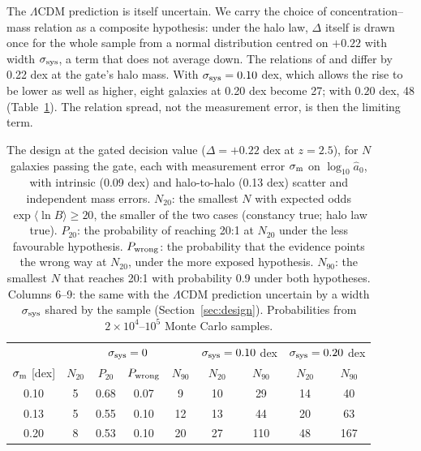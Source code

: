 \documentclass[fleqn,usenatbib]{mnras}
\begin{document}
The $\Lambda$CDM prediction is itself uncertain. We carry the choice of concentration--mass relation as a composite hypothesis: under the halo law, $\Delta$ itself is drawn once for the whole sample from a normal distribution centred on $+0.22$ with width $\sigma_{\rm sys}$, a term that does not average down. The relations of \citet{DuttonMaccio2014} and \citet{Duffy2008} differ by 0.22 dex at the gate's halo mass. With $\sigma_{\rm sys}=0.10$ dex, which allows the rise to be lower as well as higher, eight galaxies at 0.20 dex become 27; with $0.20$ dex, 48 (Table~\ref{tab:odds}). The relation spread, not the measurement error, is then the limiting term.

\begin{table}
\caption{The design at the gated decision value ($\Delta=+0.22$ dex at $z=2.5$), for $N$ galaxies passing the gate, each with measurement error $\sigma_{\rm m}$ on $\log_{10}\hat a_0$, with intrinsic (0.09 dex) and halo-to-halo (0.13 dex) scatter and independent mass errors. $N_{20}$: the smallest $N$ with expected odds $\exp\langle\ln B\rangle\geq20$, the smaller of the two cases (constancy true; halo law true). $P_{20}$: the probability of reaching 20:1 at $N_{20}$ under the less favourable hypothesis. $P_{\rm wrong}$: the probability that the evidence points the wrong way at $N_{20}$, under the more exposed hypothesis. $N_{90}$: the smallest $N$ that reaches 20:1 with probability 0.9 under both hypotheses. Columns 6--9: the same with the $\Lambda$CDM prediction uncertain by a width $\sigma_{\rm sys}$ shared by the sample (Section~\ref{sec:design}). Probabilities from $2\times10^4$--$10^5$ Monte Carlo samples.}
\label{tab:odds}
\begin{tabular}{ccccccccc}
\toprule
 & \multicolumn{4}{c}{$\sigma_{\rm sys}=0$} & \multicolumn{2}{c}{$\sigma_{\rm sys}=0.10$ dex} & \multicolumn{2}{c}{$\sigma_{\rm sys}=0.20$ dex}\\
$\sigma_{\rm m}$ [dex] & $N_{20}$ & $P_{20}$ & $P_{\rm wrong}$ & $N_{90}$ & $N_{20}$ & $N_{90}$ & $N_{20}$ & $N_{90}$\\
\midrule
0.10 & 5 & 0.68 & 0.07 & 9 & 10 & 29 & 14 & 40\\
0.13 & 5 & 0.55 & 0.10 & 12 & 13 & 44 & 20 & 63\\
0.20 & 8 & 0.53 & 0.10 & 20 & 27 & 110 & 48 & 167\\
\bottomrule
\end{tabular}
\end{table}
\end{document}
